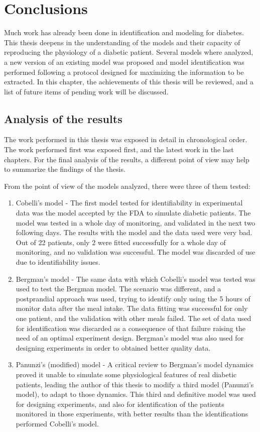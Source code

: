 \chapter{Conclusions}
\label{sec:Conclusions}

Much work has already been done in identification and modeling for diabetes. This thesis deepens in the understanding of the models and their capacity of reproducing the physiology of a diabetic patient. Several models where analyzed, a new version of an existing model was proposed and model identification was performed following a protocol designed for maximizing the information to be extracted. In this chapter, the achievements of this thesis will be reviewed, and a list of future items of pending work will be discussed.

\section{Analysis of the results}
\label{sec:AnalysisOfTheResults}

The work performed in this thesis was exposed in detail in chronological order. The work performed first was exposed first, and the latest work in the last chapters. For the final analysis of the results, a different point of view may help to summarize the findings of the thesis.

From the point of view of the models analyzed, there were three of them tested:
\begin{enumerate}
	\item Cobelli's model - The first model tested for identifiability in experimental data was the model accepted by the FDA to simulate diabetic patients. The model was tested in a whole day of monitoring, and validated in the next two following days. The results with the model and the data used were very bad. Out of 22 patients, only 2 were fitted successfully for a whole day of monitoring, and no validation was successful. The model was discarded of use due to identifiability issues.
	\item Bergman's model - The same data with which Cobelli's model was tested was used to test the Bergman model. The scenario was different, and a postprandial approach was used, trying to identify only using the 5 hours of monitor data after the meal intake. The data fitting was successful for only one patient, and the validation with other meals failed. The set of data used for identification was discarded as a consequence of that failure raising the need of an optimal experiment design. Bergman's model was also used for designing experiments in order to obtained better quality data.
	\item Panunzi's (modified) model - A critical review to Bergman's model dynamics proved it unable to simulate some physiological features of real diabetic patients, leading the author of this thesis to modify a third model (Panunzi's model), to adapt to those dynamics. This third and definitive model was used for designing experiments, and also for identification of the patients monitored in those experiments, with better results than the identifications performed Cobelli's model.
\end{enumerate}

